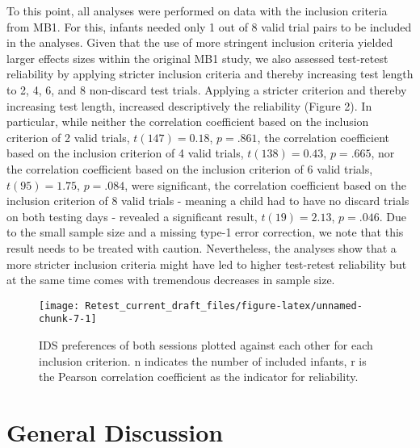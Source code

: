\documentclass[
  english,
  man,floatsintext]{apa6}
\begin{document}
To this point, all analyses were performed on data with the inclusion criteria from MB1. For this, infants needed only 1 out of 8 valid trial pairs to be included in the analyses. Given that the use of more stringent inclusion criteria yielded larger effects sizes within the original MB1 study, we also assessed test-retest reliability by applying stricter inclusion criteria and thereby increasing test length to 2, 4, 6, and 8 non-discard test trials. Applying a stricter criterion and thereby increasing test length, increased descriptively the reliability (Figure 2). In particular, while neither the correlation coefficient based on the inclusion criterion of 2 valid trials, \(t(147) = 0.18\), \(p = .861\), the correlation coefficient based on the inclusion criterion of 4 valid trials, \(t(138) = 0.43\), \(p = .665\), nor the correlation coefficient based on the inclusion criterion of 6 valid trials, \(t(95) = 1.75\), \(p = .084\), were significant, the correlation coefficient based on the inclusion criterion of 8 valid trials - meaning a child had to have no discard trials on both testing days - revealed a significant result, \(t(19) = 2.13\), \(p = .046\). Due to the small sample size and a missing type-1 error correction, we note that this result needs to be treated with caution. Nevertheless, the analyses show that a more stricter inclusion criteria might have led to higher test-retest reliability but at the same time comes with tremendous decreases in sample size.

\begin{figure}

{\centering \texttt{[image: Retest\_current\_draft\_files/figure-latex/unnamed-chunk-7-1]} 

}

\caption{IDS preferences of both sessions plotted against each other for each inclusion criterion. n indicates the number of included infants, r is the Pearson correlation coefficient as the indicator for reliability.}\label{fig:unnamed-chunk-7}
\end{figure}

\hypertarget{general-discussion}{%
\section{General Discussion}\label{general-discussion}}
\end{document}

